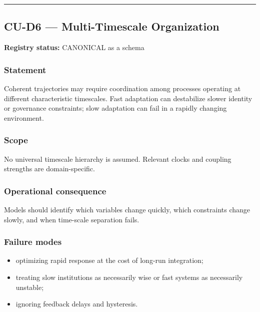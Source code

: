 \documentclass[
  11pt,
]{article}
\providecommand{\tightlist}{%
  \setlength{\itemsep}{0pt}\setlength{\parskip}{0pt}}
\begin{document}
\begin{center}\rule{0.5\linewidth}{0.5pt}\end{center}

\subsection{CU-D6 --- Multi-Timescale
Organization}\label{cu-d6-multi-timescale-organization}

\textbf{Registry status:} CANONICAL as a schema

\subsubsection{Statement}\label{statement-46}

Coherent trajectories may require coordination among processes operating
at different characteristic timescales. Fast adaptation can destabilize
slower identity or governance constraints; slow adaptation can fail in a
rapidly changing environment.

\subsubsection{Scope}\label{scope-20}

No universal timescale hierarchy is assumed. Relevant clocks and
coupling strengths are domain-specific.

\subsubsection{Operational
consequence}\label{operational-consequence-28}

Models should identify which variables change quickly, which constraints
change slowly, and when time-scale separation fails.

\subsubsection{Failure modes}\label{failure-modes-19}

\begin{itemize}
\tightlist
\item
  optimizing rapid response at the cost of long-run integration;
\item
  treating slow institutions as necessarily wise or fast systems as
  necessarily unstable;
\item
  ignoring feedback delays and hysteresis.
\end{itemize}
\end{document}

